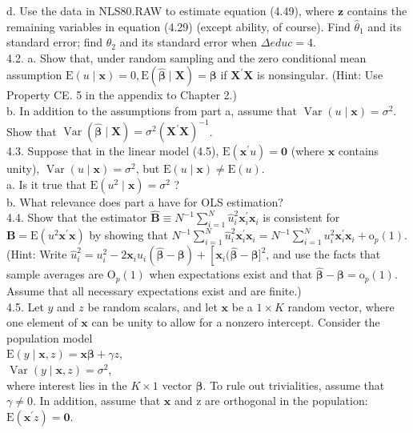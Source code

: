 \documentclass[10pt]{article}
\begin{document}
d. Use the data in NLS80.RAW to estimate equation (4.49), where $\mathbf{z}$ contains the remaining variables in equation (4.29) (except ability, of course). Find $\hat{\theta}_{1}$ and its standard error; find $\hat{\theta}_{2}$ and its standard error when $\Delta e d u c=4$.\\
4.2. a. Show that, under random sampling and the zero conditional mean assumption $\mathrm{E}(u \mid \mathbf{x})=0, \mathrm{E}(\hat{\boldsymbol{\beta}} \mid \mathbf{X})=\boldsymbol{\beta}$ if $\mathbf{X}^{\prime} \mathbf{X}$ is nonsingular. (Hint: Use Property CE. 5 in the appendix to Chapter 2.)\\
b. In addition to the assumptions from part a, assume that $\operatorname{Var}(u \mid \mathbf{x})=\sigma^{2}$. Show that $\operatorname{Var}(\hat{\boldsymbol{\beta}} \mid \mathbf{X})=\sigma^{2}\left(\mathbf{X}^{\prime} \mathbf{X}\right)^{-1}$.\\
4.3. Suppose that in the linear model (4.5), $\mathrm{E}\left(\mathbf{x}^{\prime} u\right)=\mathbf{0}$ (where $\mathbf{x}$ contains unity), $\operatorname{Var}(u \mid \mathbf{x})=\sigma^{2}$, but $\mathrm{E}(u \mid \mathbf{x}) \neq \mathrm{E}(u)$.\\
a. Is it true that $\mathrm{E}\left(u^{2} \mid \mathbf{x}\right)=\sigma^{2}$ ?\\
b. What relevance does part a have for OLS estimation?\\
4.4. Show that the estimator $\hat{\mathbf{B}} \equiv N^{-1} \sum_{i=1}^{N} \hat{u}_{i}^{2} \mathbf{x}_{i}^{\prime} \mathbf{x}_{i}$ is consistent for $\mathbf{B}=\mathrm{E}\left(u^{2} \mathbf{x}^{\prime} \mathbf{x}\right)$ by showing that $N^{-1} \sum_{i=1}^{N} \hat{u}_{i}^{2} \mathbf{x}_{i}^{\prime} \mathbf{x}_{i}=N^{-1} \sum_{i=1}^{N} u_{i}^{2} \mathbf{x}_{i}^{\prime} \mathbf{x}_{i}+\mathrm{o}_{p}(1)$. (Hint: Write $\hat{u}_{i}^{2}=u_{i}^{2}- 2 \mathbf{x}_{i} u_{i}(\hat{\boldsymbol{\beta}}-\boldsymbol{\beta})+\left[\mathbf{x}_{i}(\hat{\boldsymbol{\beta}}-\boldsymbol{\beta}]^{2}\right.$, and use the facts that sample averages are $\mathrm{O}_{p}(1)$ when expectations exist and that $\hat{\boldsymbol{\beta}}-\boldsymbol{\beta}=\mathrm{o}_{p}(1)$. Assume that all necessary expectations exist and are finite.)\\
4.5. Let $y$ and $z$ be random scalars, and let $\mathbf{x}$ be a $1 \times K$ random vector, where one element of $\mathbf{x}$ can be unity to allow for a nonzero intercept. Consider the population model\\
$\mathrm{E}(y \mid \mathbf{x}, z)=\mathbf{x} \boldsymbol{\beta}+\gamma z$,\\
$\operatorname{Var}(y \mid \mathbf{x}, z)=\sigma^{2}$,\\
where interest lies in the $K \times 1$ vector $\boldsymbol{\beta}$. To rule out trivialities, assume that $\gamma \neq 0$. In addition, assume that $\mathbf{x}$ and z are orthogonal in the population: $\mathrm{E}\left(\mathbf{x}^{\prime} z\right)=\mathbf{0}$.
\end{document}
